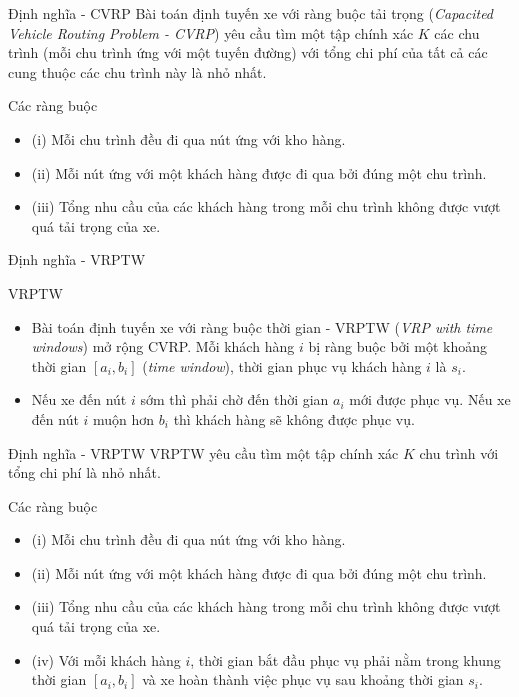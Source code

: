\begin{frame}{Định nghĩa - CVRP}
    Bài toán định tuyến xe với ràng buộc tải trọng (\textit{Capacited Vehicle Routing Problem - CVRP}) yêu cầu tìm một tập chính xác $K$ các chu trình (mỗi chu trình ứng với một tuyến đường) với tổng chi phí của tất cả các cung thuộc các chu trình này là nhỏ nhất. 
    \begin{block}{Các ràng buộc}
        \begin{itemize}
            \item[] (i) Mỗi chu trình đều đi qua nút ứng với kho hàng.
            \item[] (ii) Mỗi nút ứng với một khách hàng được đi qua bởi đúng một chu trình.
            \item[] (iii) Tổng nhu cầu của các khách hàng trong mỗi chu trình không được vượt quá tải trọng của xe.
        \end{itemize}
    \end{block}
\end{frame}

\begin{frame}{Định nghĩa - VRPTW}
    \begin{block}{VRPTW}
        \begin{itemize}
            \item Bài toán định tuyến xe với ràng buộc thời gian - VRPTW (\textit{VRP with time windows}) mở rộng CVRP. Mỗi khách hàng $i$ bị ràng buộc bởi một khoảng thời gian $[a_i, b_i]$ (\textit{time window}), thời gian phục vụ khách hàng $i$ là $s_i$.
            \item Nếu xe đến nút $i$ sớm thì phải chờ đến thời gian $a_i$ mới được phục vụ. Nếu xe đến nút $i$ muộn hơn $b_i$ thì khách hàng sẽ không được phục vụ.
        \end{itemize}
    \end{block}
\end{frame}

\begin{frame}{Định nghĩa - VRPTW}
    VRPTW yêu cầu tìm một tập chính xác $K$ chu trình với tổng chi phí là nhỏ nhất.
    \begin{block}{Các ràng buộc}
        \begin{itemize}
            \item[] (i) Mỗi chu trình đều đi qua nút ứng với kho hàng.
            \item[] (ii) Mỗi nút ứng với một khách hàng được đi qua bởi đúng một chu trình.
            \item[] (iii) Tổng nhu cầu của các khách hàng trong mỗi chu trình không được vượt quá tải trọng của xe.
            \item[] (iv) Với mỗi khách hàng $i$, thời gian bắt đầu phục vụ phải nằm trong khung thời gian $[a_i, b_i]$ và xe hoàn thành việc phục vụ sau khoảng thời gian $s_i$.
        \end{itemize}    
    \end{block}
\end{frame}


